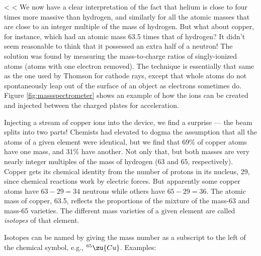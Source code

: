     <%
    <%
        We now have a clear interpretation of the fact that helium
        is close to four times more massive than hydrogen, and
        similarly for all the atomic masses that are close to an
        integer multiple of the mass of hydrogen. But what about
        copper, for instance, which had an atomic mass 63.5 times
        that of hydrogen? It didn't seem reasonable to think that it
        possessed an extra half of a neutron! The solution was found
        by measuring the mass-to-charge ratios of singly-ionized
        atoms (atoms with one electron removed). The technique is
        essentially that same as the one used by Thomson for cathode
        rays, except that whole atoms do not spontaneously leap out
        of the surface of an object as electrons sometimes do. 
        Figure \ref{fig:massspectrometer} shows an example of how the ions can be created and
        injected between the charged plates for acceleration.

        Injecting a stream of copper ions into the device, we find a
        surprise --- the beam splits into two parts! Chemists had
        elevated to dogma the assumption that all the atoms of a
        given element were identical, but we find that 69\% of
        copper atoms have one mass, and 31\% have another.  Not only
        that, but both masses are very nearly integer multiples of
        the mass of hydrogen (63 and 65, respectively).  Copper gets
        its chemical identity from the number of protons in its
        nucleus, 29, since chemical reactions work by electric
        forces. But apparently some copper atoms have $63-29=34$
        neutrons while others have $65-29=36$. The atomic mass of
        copper, 63.5, reflects the proportions of the mixture of the
        mass-63 and mass-65 varieties.  The different mass varieties
        of a given element are called \emph{isotopes} of that element.

\pagebreak

        Isotopes can be named by giving the mass number as a
        subscript to the left of the chemical symbol, e.g.,
        $^{65}\zu{Cu}$. Examples:

